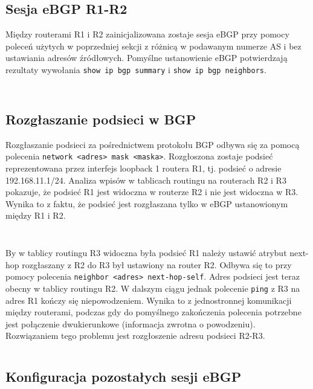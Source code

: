 \documentclass[a4paper,12pt,notitlepage]{article}
\begin{document}
\subsection{Sesja eBGP R1-R2}

Między routerami R1 i R2 zainicjalizowana zostaje sesja eBGP przy pomocy poleceń użytych w poprzedniej sekcji z różnicą w podawanym numerze AS i bez ustawiania adresów źródłowych. Pomyślne ustanowienie eBGP potwierdzają rezultaty wywołania \texttt{show ip bgp summary} i \texttt{show ip bgp neighbors}.
\inputminted[label=Rezultat polecenia show ip bgp summary na R1, firstline=123, lastline=128]{text}{Routers/R1.txt}%
\inputminted[label=Rezultat polecenia show ip bgp summary na R2, firstline=321, lastline=327]{text}{Routers/R2.txt}%

\subsection{Rozgłaszanie podsieci w BGP}

Rozgłaszanie podsieci za pośrednictwem protokołu BGP odbywa się za pomocą polecenia \texttt{network <adres> mask <maska>}. Rozgłoszona zostaje podsieć reprezentowana przez interfejs loopback 1 routera R1, tj. podsieć o adresie 192.168.11.1/24. Analiza wpisów w tablicach routingu na routerach R2 i R3 pokazuje, że podsieć R1 jest widoczna w routerze R2 i nie jest widoczna w R3. Wynika to z faktu, że podsieć jest rozgłaszana tylko w eBGP ustanowionym między R1 i R2.
\inputminted[label= Tablica routingu na R2, firstline=468, lastline=496]{text}{Routers/R2.txt}%
\inputminted[label= Tablica routingu na R3, firstline=528, lastline=547]{text}{Routers/R3.txt}%

By w tablicy routingu R3 widoczna była podsieć R1 należy ustawić atrybut next-hop rozgłaszany z R2 do R3 był ustawiony na router R2. Odbywa się to przy pomocy polecenia \texttt{neighbor <adres> next-hop-self}. Adres podsieci jest teraz obecny w tablicy routingu R2. W dalszym ciągu jednak polecenie \texttt{ping} z R3 na adres R1 kończy się niepowodzeniem. Wynika to z jednostronnej komunikacji między routerami, podczas gdy do pomyślnego zakończenia polecenia potrzebne jest połączenie dwukierunkowe (informacja zwrotna o powodzeniu). Rozwiązaniem tego problemu jest rozgłoszenie adresu podsieci R2-R3.
\inputminted[label= Pingowanie adresu R1 z routera R3, firstline=582, lastline=587]{text}{Routers/R3.txt}%

\subsection{Konfiguracja pozostałych sesji eBGP}
\end{document}
